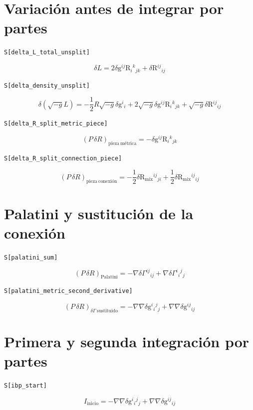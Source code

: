 \section*{Variación antes de integrar por partes}

\noindent\texttt{S[delta\_L\_total\_unsplit]}

\[
\boxed{\delta L = 2\delta \mathrm{g}{}^{ij}\mathrm{R}{}_{i}{}^{k}{}_{jk} + \delta \mathrm{R}{}^{ij}{}_{ij}}
\]


\noindent\texttt{S[delta\_density\_unsplit]}

\[
\boxed{\delta\!\left(\sqrt{-g}L\right) = -\frac{1}{2}R\sqrt{-g}\delta \mathrm{g}{}^{i}{}_{i} + 2\sqrt{-g}\delta \mathrm{g}{}^{ij}\mathrm{R}{}_{i}{}^{k}{}_{jk} + \sqrt{-g}\delta \mathrm{R}{}^{ij}{}_{ij}}
\]


\noindent\texttt{S[delta\_R\_split\_metric\_piece]}

\[
\boxed{\left(P\,\delta R\right)_{\mathrm{pieza\ métrica}} = -\delta \mathrm{g}{}^{ij}\mathrm{R}{}_{i}{}^{k}{}_{jk}}
\]


\noindent\texttt{S[delta\_R\_split\_connection\_piece]}

\[
\boxed{\left(P\,\delta R\right)_{\mathrm{pieza\ conexión}} = -\frac{1}{2}\delta \mathrm{R}_{\mathrm{mix}}{}^{ij}{}_{ji} + \frac{1}{2}\delta \mathrm{R}_{\mathrm{mix}}{}^{ij}{}_{ij}}
\]


\section*{Palatini y sustitución de la conexión}

\noindent\texttt{S[palatini\_sum]}

\[
\boxed{\left(P\,\delta R\right)_{\mathrm{Palatini}} = -\nabla\delta\Gamma{}^{ij}{}_{ij} + \nabla\delta\Gamma{}^{i}{}_{i}{}^{j}{}_{j}}
\]


\noindent\texttt{S[palatini\_metric\_second\_derivative]}

\[
\boxed{\left(P\,\delta R\right)_{\delta\Gamma\ \mathrm{sustituido}} = -\nabla\nabla\delta \mathrm{g}{}^{i}{}_{i}{}^{j}{}_{j} + \nabla\nabla\delta \mathrm{g}{}^{ij}{}_{ij}}
\]


\section*{Primera y segunda integración por partes}

\noindent\texttt{S[ibp\_start]}

\[
\boxed{I_{\mathrm{inicio}} = -\nabla\nabla\delta \mathrm{g}{}^{i}{}_{i}{}^{j}{}_{j} + \nabla\nabla\delta \mathrm{g}{}^{ij}{}_{ij}}
\]


